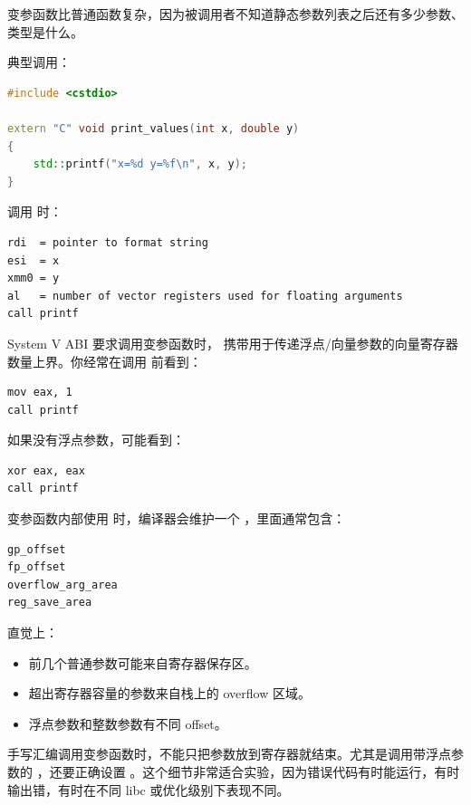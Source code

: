 变参函数比普通函数复杂，因为被调用者不知道静态参数列表之后还有多少参数、类型是什么。

典型调用：

\begin{lstlisting}[language=C++]
#include <cstdio>

extern "C" void print_values(int x, double y)
{
    std::printf("x=%d y=%f\n", x, y);
}
\end{lstlisting}

调用  时：

\begin{lstlisting}
rdi  = pointer to format string
esi  = x
xmm0 = y
al   = number of vector registers used for floating arguments
call printf
\end{lstlisting}

System V ABI 要求调用变参函数时， 携带用于传递浮点/向量参数的向量寄存器数量上界。你经常在调用  前看到：

\begin{lstlisting}
mov eax, 1
call printf
\end{lstlisting}

如果没有浮点参数，可能看到：

\begin{lstlisting}
xor eax, eax
call printf
\end{lstlisting}

变参函数内部使用  时，编译器会维护一个 ，里面通常包含：

\begin{lstlisting}
gp_offset
fp_offset
overflow_arg_area
reg_save_area
\end{lstlisting}

直觉上：

\begin{itemize}
  \item 前几个普通参数可能来自寄存器保存区。
  \item 超出寄存器容量的参数来自栈上的 overflow 区域。
  \item 浮点参数和整数参数有不同 offset。
\end{itemize}

\begin{deepdive}
手写汇编调用变参函数时，不能只把参数放到寄存器就结束。尤其是调用带浮点参数的 ，还要正确设置 。这个细节非常适合实验，因为错误代码有时能运行，有时输出错，有时在不同 libc 或优化级别下表现不同。
\end{deepdive}

